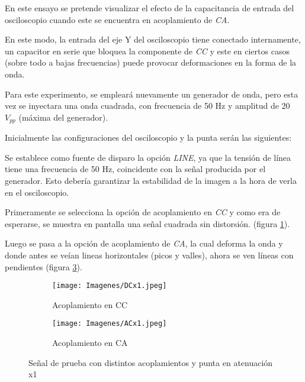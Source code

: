 En este ensayo se pretende visualizar el efecto de la capacitancia de entrada del osciloscopio cuando este se encuentra en acoplamiento de \textit{CA}.

En este modo, la entrada del eje Y del osciloscopio tiene conectado internamente, un capacitor en serie que bloquea la componente de \textit{CC} y este en ciertos casos (sobre todo a bajas frecuencias) puede provocar deformaciones en la forma de la onda. 

Para este experimento, se empleará nuevamente un generador de onda, pero esta vez se inyectara una onda cuadrada, con frecuencia de 50 Hz y amplitud de 20 $V_{pp}$ (máxima del generador). 

Inicialmente las configuraciones del osciloscopio y la punta serán las siguientes:

\begin{table}[H]
    \centering
        \def\tablename{Tabla} 
        \caption{Cuadro de Controles}
        \label{tab:cont2}
\end{table}

Se establece como fuente de disparo la opción \textit{LINE}, ya que la tensión de línea tiene una frecuencia de 50 Hz, coincidente con la señal producida por el generador. Esto debería garantizar la estabilidad de la imagen a la hora de verla en el osciloscopio.

Primeramente se selecciona la opción de acoplamiento en \textit{CC} y como era de esperarse, se muestra en pantalla una señal cuadrada sin distorsión. (figura \ref{dcx1}).

Luego se pasa a la opción de acoplamiento de \textit{CA}, la cual deforma la onda y donde antes se veían lineas horizontales (picos y valles), ahora se ven líneas con pendientes (figura \ref{acx1}).


\begin{figure}[H]
    \begin{center}
        \begin{subfigure}[b]{0.5\textwidth}
        \centering  
            \texttt{[image: Imagenes/DCx1.jpeg]}
        \caption{Acoplamiento en CC}
        \label{dcx1}
    \end{subfigure}
    \hfill
    \begin{subfigure}[b]{0.49\textwidth}
        \centering
            \texttt{[image: Imagenes/ACx1.jpeg]}
        \caption{Acoplamiento en CA}
        \label{acx1}
    \end{subfigure}
    \caption{Señal de prueba con distintos acoplamientos y punta en atenuación x1}
    \end{center}
\end{figure}

